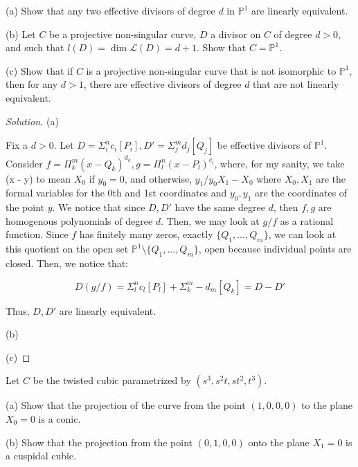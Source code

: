 \documentclass[10pt]{article}
\newenvironment{problem}[2][Problem]{\begin{trivlist}
\item[\hskip \labelsep {\bfseries #1}\hskip \labelsep {\bfseries #2.}]}{\end{trivlist}}
\begin{document}
\begin{problem}{10.2}

(a) Show that any two effective divisors of degree $d$ in $\mathbb{P}^1$ are linearly equivalent.

(b) Let $C$ be a projective non-singular curve, $D$ a divisor on $C$ of degree $d > 0$, and such that $l(D) = \dim \mathcal{L}(D) = d + 1$. Show that $C = \mathbb{P}^1$. 

(c) Show that if $C$ is a projective non-singular curve that is not isomorphic to $\mathbb{P}^1$, then for any $d > 1$, there are effective divisors of degree $d$ that are not linearly equivalent.

\end{problem}

\begin{proof}[Solution]

(a)

Fix a $d > 0$. Let $D = \Sigma_i^n c_i [P_i], D' = \Sigma_j^m d_j [Q_j]$ be effective divisors of $\mathbb{P}^1$. Consider $f = \Pi_k^{m} (x-Q_k)^{d_k}, g = \Pi_l^n (x-P_l)^{c_l}$, where, for my sanity, we take (x - y) to mean $X_0$ if $y_0 = 0$, and otherwise, $y_1/y_0X_1 - X_0$ where $X_0,X_1$ are the formal variables for the 0th and 1st coordinates and $y_0,y_1$ are the coordinates of the point $y$. We notice that since $D, D'$ have the same degree $d$, then $f,g$ are homogenous polynomials of degree $d$. Then, we may look at $g/f$ as a rational function. Since $f$ has finitely many zeros, exactly $\{ Q_1,...,Q_m \}$, we can look at this quotient on the open set $\mathbb{P}^1 \setminus \{ Q_1,...,Q_m \}$, open because individual points are closed. Then, we notice that:

$$D(g/f) = \Sigma_l^n c_l [P_l ] + \Sigma_k^m -d_m [Q_k] = D - D'$$

Thus, $D, D'$ are linearly equivalent.

(b)

(c)


\end{proof}

\begin{problem}{10.3}

Let $C$ be the twisted cubic parametrized by $(s^3, s^2t, st^2, t^3)$.

(a) Show that the projection of the curve from the point $(1,0,0,0)$ to the plane $X_0 = 0$ is a conic.

(b) Show that the projection from the point $(0,1,0,0)$ onto the plane $X_1 = 0$ is a cuspidal cubic.

\end{problem}
\end{document}
